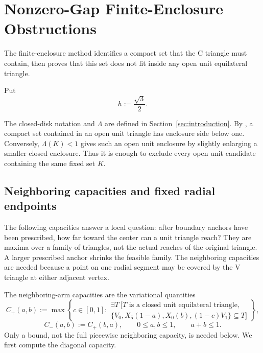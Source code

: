 \section{Nonzero-Gap Finite-Enclosure Obstructions}
\label{sec:nonzero-gap-finite-enclosure-optimization}
\label{sec:finite-enclosure}

The finite-enclosure method identifies a compact set that the C triangle
must contain, then proves that this set does not fit inside any open unit
equilateral triangle.

Put
\[
 h:=\frac{\sqrt3}{2}.
\]

The closed-disk notation and $\Lambda$ are defined in
Section~\ref{sec:introduction}. By , a
compact set contained in an open unit triangle has enclosure side below
one. Conversely, $\Lambda(K)<1$ gives such an open unit enclosure by
slightly enlarging a smaller closed enclosure. Thus it is enough to
exclude every open unit candidate containing the same fixed set $K$.



\subsection{Neighboring capacities and fixed radial endpoints}
\label{subsec:new-neighbor-ray-capacity}

The following capacities answer a local question: after boundary anchors
have been prescribed, how far toward the center can a unit triangle reach?
They are maxima over a family of triangles, not the actual reaches of the
original triangle. A larger prescribed anchor shrinks the feasible family.
The neighboring capacities are needed because a point on one radial segment
may be covered by the V triangle at either adjacent vertex.

The neighboring-arm capacities are the variational quantities
\[
 C_+(a,b):=
 \max\left\{c\in[0,1]:
 \begin{array}{l}
 \exists T\ [T\text{ is a closed unit equilateral triangle},\\
 \{V_0,X_5(1-a),X_0(b),(1-c)V_1\}\subseteq T]
 \end{array}\right\},
\]
\[
 C_-(a,b):=C_+(b,a),
 \qquad
 0\le a,b\le1,
 \qquad
 a+b\le1.
\]
Only a bound, not the full piecewise neighboring capacity, is needed below.
We first compute the diagonal capacity.

